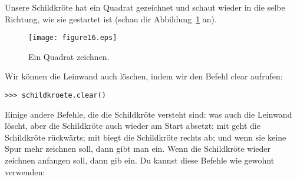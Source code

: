 Unsere Schildkröte hat ein Quadrat gezeichnet und schaut wieder in die selbe Richtung, wie sie gestartet ist (schau dir Abbildung~\ref{fig16} an).

\begin{figure}
\begin{center}
\texttt{[image: figure16.eps]}
\end{center}
\caption{Ein Quadrat zeichnen.}\label{fig16}
\end{figure}

Wir können die Leinwand auch löschen, indem wir den Befehl clear aufrufen:

\begin{listing}
\begin{verbatim}
>>> schildkroete.clear()
\end{verbatim}
\end{listing}

Einige andere Befehle, die die Schildkröte versteht sind:  was auch die Leinwand löscht, aber die Schildkröte auch wieder am Start absetzt; mit  geht die Schildkröte rückwärts; mit  biegt die Schildkröte rechts ab; und wenn sie keine Spur mehr zeichnen soll, dann gibt man  ein. Wenn die Schildkröte wieder zeichnen anfangen soll, dann gib  ein. Du kannst diese Befehle wie gewohnt verwenden:

